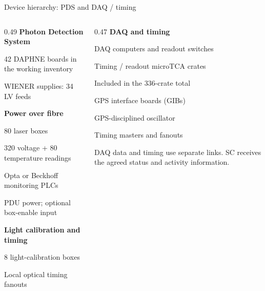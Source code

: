 \begin{frame}{Device hierarchy: PDS and DAQ / timing}
\small
\begin{columns}[T,onlytextwidth]
\begin{column}{0.49\textwidth}
\textbf{Photon Detection System}\par
\hspace*{0.8em}42 DAPHNE boards in the working inventory\par
\hspace*{0.8em}WIENER supplies: 34 LV feeds\par\medskip
\textbf{Power over fibre}\par
\hspace*{0.8em}80 laser boxes\par
\hspace*{1.6em}320 voltage + 80 temperature readings\par
\hspace*{0.8em}Opta or Beckhoff monitoring PLCs\par
\hspace*{0.8em}PDU power; optional box-enable input\par\medskip
\textbf{Light calibration and timing}\par
\hspace*{0.8em}8 light-calibration boxes\par
\hspace*{0.8em}Local optical timing fanouts
\end{column}
\begin{column}{0.47\textwidth}
\textbf{DAQ and timing}\par
\hspace*{0.8em}DAQ computers and readout switches\par
\hspace*{0.8em}Timing / readout microTCA crates\par
\hspace*{1.6em}Included in the 336-crate total\par
\hspace*{0.8em}GPS interface boards (GIBs)\par
\hspace*{0.8em}GPS-disciplined oscillator\par
\hspace*{0.8em}Timing masters and fanouts\par\bigskip
DAQ data and timing use separate links. SC receives the agreed status and activity information.
\end{column}
\end{columns}
\end{frame}

